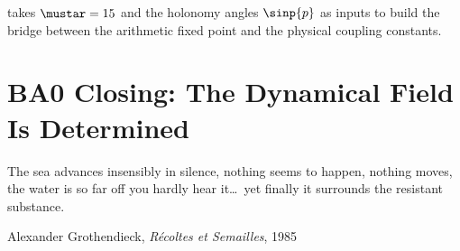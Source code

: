 \documentclass[12pt,a4paper]{article}
\begin{document}
\medskip
\cite{companion_M5} takes $\mustar = 15$ and the holonomy angles $\sinp{p}$
as inputs to build the bridge between the arithmetic fixed point
and the physical coupling constants.


\newpage


\section{BA0 Closing: The Dynamical Field Is Determined}
\label{sec:BA0_closing}

\epigraph{The sea advances insensibly in silence, nothing seems to happen,
nothing moves, the water is so far off you hardly hear it\ldots\ yet
finally it surrounds the resistant substance.}{Alexander Grothendieck, \textit{R\'ecoltes et Semailles}, 1985}

\vspace{1em}
\end{document}
